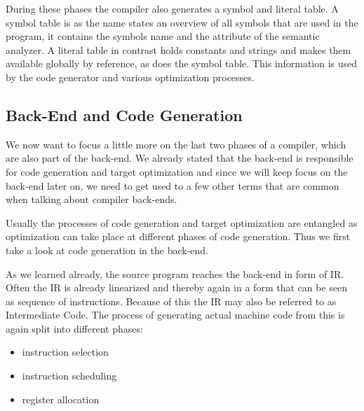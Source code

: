 During these phases the compiler also generates a symbol and literal table.
A symbol table is as the name states an overview of all symbols that are used in the program, it contains the symbols name and the attribute of the semantic analyzer.
A literal table in contrast holds constants and strings and makes them available globally by reference, as does the symbol table.
This information is used by the code generator and various optimization processes.

\subsection{Back-End and Code Generation}
We now want to focus a little more on the last two phases of a compiler, which are also part of the back-end.
We already stated that the back-end is responsible for code generation and target optimization and since we will keep focus on the back-end later on, we need to get used to a few other terms that are common when talking about compiler back-ends.

Usually the processes of code generation and target optimization are entangled as optimization can take place at different phases of code generation.
Thus we first take a look at code generation in the back-end.

As we learned already, the source program reaches the back-end in form of IR.
Often the IR is already linearized and thereby again in a form that can be seen as sequence of instructions.
Because of this the IR may also be referred to as Intermediate Code.
The process of generating actual machine code from this is again split into different phases:
\begin{itemize}
    \item instruction selection
    \item instruction scheduling
    \item register allocation
\end{itemize}

